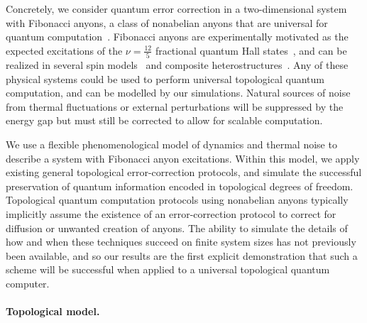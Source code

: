\documentclass[aps, prl, letterpaper, twocolumn, superscriptaddress, notitlepage, 10pt]{revtex4-1}
\begin{document}
Concretely, we consider quantum error correction in a two-dimensional 
system with Fibonacci anyons, a class of nonabelian anyons that are universal for quantum 
computation~\cite{Freedman2002, Nayak2008}. Fibonacci anyons are experimentally motivated as the 
expected excitations of the $\nu=\frac{12}{5}$ fractional quantum Hall 
states~\cite{Slingerland2001}, and can be realized in several spin 
models~\cite{Levin2005, Bonesteel2012, Kapit2013, Palumbo2014} and composite 
heterostructures~\cite{Mong2014}.
Any of these physical systems could be used to perform universal topological quantum computation, and can be modelled by our simulations. Natural sources of noise from thermal fluctuations or external perturbations will be suppressed by the energy gap but must still be corrected to allow for scalable computation.

We use a flexible phenomenological model of dynamics and thermal 
noise to describe a system with Fibonacci anyon excitations. Within 
this model, we apply existing general topological error-correction protocols, and 
simulate the successful preservation of quantum information encoded in topological 
degrees of freedom. Topological quantum computation protocols using nonabelian anyons 
typically implicitly assume the existence of an error-correction protocol to 
correct for diffusion or unwanted creation of anyons. 
The ability to simulate the details of how and when these techniques succeed on finite system sizes has not previously been available, and so our results are the first explicit demonstration that such a scheme will be successful when applied to a universal topological quantum computer.


\paragraph{Topological model.}
\end{document}
